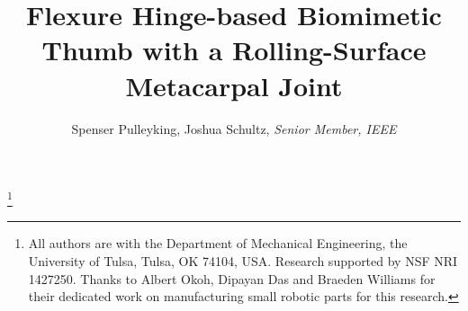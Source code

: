 \documentclass[letterpaper, 10 pt, conference]{ieeeconf}
\begin{document}
%
\title{Flexure Hinge-based Biomimetic Thumb with a Rolling-Surface Metacarpal Joint}


\author{Spenser Pulleyking, Joshua Schultz, \textit{Senior Member, IEEE}}

\thanks{All authors are with the Department of Mechanical Engineering, the University of Tulsa, Tulsa, OK 74104, USA. Research supported by NSF NRI 1427250. Thanks to Albert Okoh, Dipayan Das and Braeden Williams for their dedicated work on manufacturing small robotic parts for this research.}



% 



\end{document}
